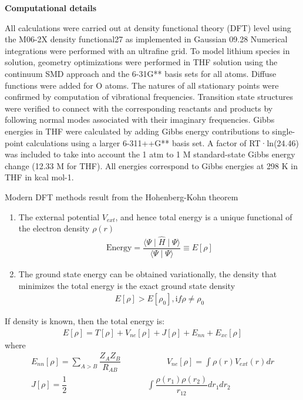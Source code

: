 \documentclass[journal=jacsat,manuscript=article]{achemso}
\begin{document}
	{\bf Computational details}
	
	All calculations were carried out at density functional theory (DFT) level using the M06-2X density functional27 as
	implemented in Gaussian 09.28 Numerical integrations were performed with an ultrafine grid. To model lithium species in
	solution, geometry optimizations were performed in THF solution using the continuum SMD approach and the 6-31G** basis sets for all atoms. Diffuse functions were added for O atoms. The natures of all stationary points were confirmed by computation of vibrational frequencies. Transition	state structures were verified to connect with the corresponding reactants and products by following normal modes associated with their imaginary frequencies. Gibbs energies in	THF were calculated by adding Gibbs energy contributions to	single-point calculations using a larger 6-311++G** basis set. A factor of RT·ln(24.46) was included to take into account the 1 atm to 1 M standard-state Gibbs energy change	(12.33 M for THF). All energies correspond to Gibbs energies at 298 K in THF in kcal mol-1.
	
	Modern DFT methods result from the Hohenberg-Kohn theorem
		\begin{enumerate}
		\item The external potential $V_{ext}$, and hence total energy is a unique functional of the electron density $\rho(r)$
				\begin{align*}
					{\mathrm {Energy}} = \dfrac{\langle\Psi\mid\hat{H}\mid\Psi\rangle}{\langle\Psi\mid\Psi\rangle} \equiv E[\rho]
				\end{align*}
		\item The ground state energy can be obtained variationally, the density that minimizes the total energy is the exact ground state density
				\begin{align*}
					E[\rho] > E[\rho_0], {\mathrm if }\rho \ne \rho_0
				\end{align*}
		\end{enumerate}
	If density is known, then the total energy is:
		\begin{align*}
			E[\rho]=T[\rho]+V_{ne}[\rho] + J[\rho] + E_{nn} + E_{xc}[\rho] 
		\end{align*}
		where 
		\begin{align*}
			E_{nn}[\rho] = \sum_{A>B}\dfrac{Z_AZ_B}{R_{AB}}  \hspace{1cm}&\hspace{1cm}
			V_{ne}[\rho] = \int\rho(r)V_{ext}(r)dr \\
			J[\rho] = \dfrac{1}{2}&\int\dfrac{\rho(r_1)\rho(r_2)}{r_{12}}dr_1dr_2
		\end{align*}

	

		
\end{document}
